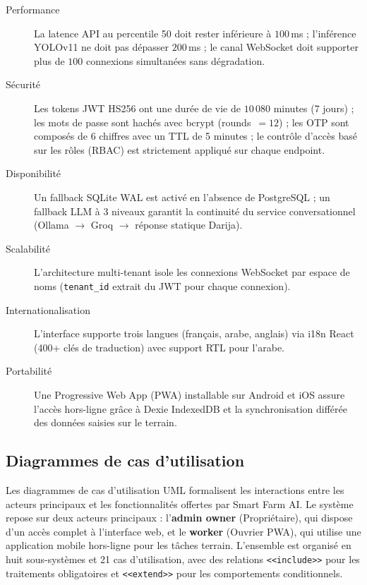 \begin{description}
  \item[Performance] La latence API au percentile 50 doit rester inférieure à
        $100$\,ms ; l'inférence YOLOv11 ne doit pas dépasser $200$\,ms ; le canal
        WebSocket doit supporter plus de $100$ connexions simultanées sans dégradation.
  \item[Sécurité] Les tokens JWT HS256 ont une durée de vie de $10\,080$ minutes
        (7 jours) ; les mots de passe sont hachés avec bcrypt (rounds~$= 12$) ;
        les OTP sont composés de 6 chiffres avec un TTL de 5 minutes ; le
        contrôle d'accès basé sur les rôles (RBAC) est strictement appliqué
        sur chaque endpoint.
  \item[Disponibilité] Un fallback SQLite WAL est activé en l'absence de PostgreSQL ;
        un fallback LLM à 3 niveaux garantit la continuité du service conversationnel
        (Ollama $\rightarrow$ Groq $\rightarrow$ réponse statique Darija).
  \item[Scalabilité] L'architecture multi-tenant isole les connexions WebSocket par
        espace de noms (\texttt{tenant\_id} extrait du JWT pour chaque connexion).
  \item[Internationalisation] L'interface supporte trois langues (français, arabe,
        anglais) via i18n React (400+ clés de traduction) avec support RTL pour
        l'arabe.
  \item[Portabilité] Une Progressive Web App (PWA) installable sur Android et iOS
        assure l'accès hors-ligne grâce à Dexie IndexedDB et la synchronisation
        différée des données saisies sur le terrain.
\end{description}


\subsection{Diagrammes de cas d'utilisation}
\label{sec:uc}

Les diagrammes de cas d'utilisation UML formalisent les interactions entre les acteurs
principaux et les fonctionnalités offertes par Smart Farm AI. Le système repose sur deux acteurs principaux : l'\textbf{admin owner} (Propriétaire),
qui dispose d'un accès complet à l'interface web, et le \textbf{worker} (Ouvrier PWA),
qui utilise une application mobile hors-ligne pour les tâches
terrain. L'ensemble est organisé en huit sous-systèmes et 21 cas d'utilisation,
avec des relations \texttt{<<include>>} pour les traitements obligatoires et
\texttt{<<extend>>} pour les comportements conditionnels.

